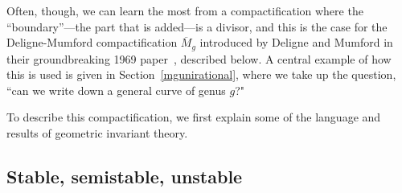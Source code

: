 Often, though, we can learn the most from a compactification where the ``boundary''---the part that is added---is a divisor, and this is the case for the Deligne-Mumford compactification
$\overline M_g$ introduced by Deligne and Mumford in their groundbreaking 1969 paper~\cite{Deligne-Mumford}, described below. A central example of how this is used is given in Section~\ref{mgunirational}, where we take up the question, ``can we write down a general curve of genus $g$?" 

To describe this compactification, we first explain some of the language and results of geometric
invariant theory.






\subsection{Stable, semistable, unstable}

